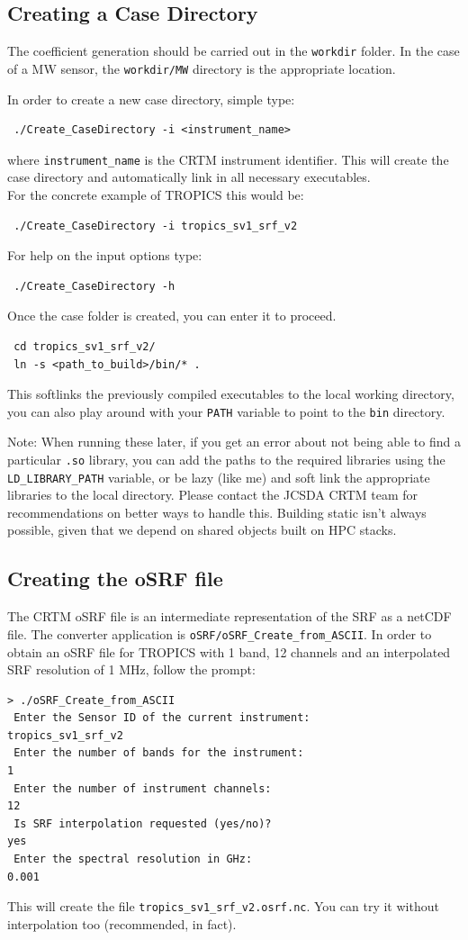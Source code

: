 \subsection{Creating a Case Directory}
The coefficient generation should be carried out in the \verb|workdir| folder.
In the case of a MW sensor, the \verb|workdir/MW| directory is the appropriate location.

In order to create a new case directory, simple type:
\begin{verbatim}
 ./Create_CaseDirectory -i <instrument_name>
\end{verbatim}
where \verb|instrument_name| is the CRTM instrument identifier. This will create the case directory and automatically link in all necessary executables.\\
For the concrete example of TROPICS this would be:
\begin{verbatim}
 ./Create_CaseDirectory -i tropics_sv1_srf_v2
\end{verbatim}
For help on the input options type:
\begin{verbatim}
 ./Create_CaseDirectory -h
\end{verbatim}
Once the case folder is created, you can enter it to proceed.
\begin{verbatim}
 cd tropics_sv1_srf_v2/
 ln -s <path_to_build>/bin/* .  
\end{verbatim}
This softlinks the previously compiled executables to the local working directory, you can also play around with your \verb|PATH| variable to point to the \verb|bin| directory. 

Note: When running these later, if you get an error about not being able to find a particular \verb|.so| library, you can add the paths to the required libraries using the \verb|LD_LIBRARY_PATH| variable, or be lazy (like me) and soft link the appropriate libraries to the local directory.   Please contact the JCSDA CRTM team for recommendations on better ways to handle this.   Building static isn't always possible, given that we depend on shared objects built on HPC stacks.

\subsection{Creating the oSRF file}
The CRTM oSRF file is an intermediate representation of the SRF as a netCDF file. The converter application is \verb|oSRF/oSRF_Create_from_ASCII|.
In order to obtain an oSRF file for TROPICS with 1 band, 12 channels and an interpolated SRF resolution of 1 MHz, follow the prompt:
\begin{verbatim}
> ./oSRF_Create_from_ASCII
 Enter the Sensor ID of the current instrument: 
tropics_sv1_srf_v2
 Enter the number of bands for the instrument: 
1
 Enter the number of instrument channels: 
12
 Is SRF interpolation requested (yes/no)?
yes 
 Enter the spectral resolution in GHz: 
0.001
\end{verbatim}
This will create the file \verb|tropics_sv1_srf_v2.osrf.nc|.  You can try it without interpolation too (recommended, in fact).  

